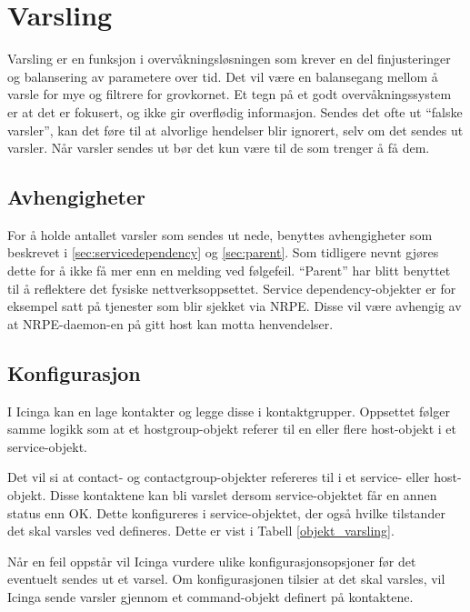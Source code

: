 \section{Varsling}\label{sec:varsling}
Varsling er en funksjon i overvåkningsløsningen som krever en del finjusteringer og balansering av parametere over tid. Det vil være en balansegang mellom å varsle for mye og filtrere for grovkornet. Et tegn på et godt overvåkningssystem er at det er fokusert, og ikke gir overflødig informasjon\cite{buildingnagiosmonitoring}. Sendes det ofte ut ``falske varsler'', kan det føre til at alvorlige hendelser blir ignorert, selv om det sendes ut varsler. Når varsler sendes ut bør det kun være til de som trenger å få dem.

\subsection{Avhengigheter}
For å holde antallet varsler som sendes ut nede, benyttes avhengigheter som beskrevet i \ref{sec:servicedependency}  og \ref{sec:parent}. Som tidligere nevnt gjøres dette for å ikke få mer enn en melding ved følgefeil. ``Parent'' har blitt benyttet til å reflektere det fysiske nettverksoppsettet. Service dependency-objekter er for eksempel satt på tjenester som blir sjekket via NRPE. Disse vil være avhengig av at NRPE-daemon-en på gitt host kan motta henvendelser.

\subsection{Konfigurasjon}
I Icinga kan en lage kontakter og legge disse i kontaktgrupper. Oppsettet følger samme logikk som at et hostgroup-objekt referer til en eller flere host-objekt i et service-objekt.

Det vil si at contact- og contactgroup-objekter refereres til i et service- eller host-objekt. Disse kontaktene kan bli varslet dersom service-objektet får en annen status enn OK. Dette konfigureres i service-objektet, der også hvilke tilstander det skal varsles ved defineres. Dette er vist i Tabell \ref{objekt_varsling}.

Når en feil oppstår vil Icinga vurdere ulike konfigurasjonsopsjoner før det eventuelt sendes ut et varsel. Om konfigurasjonen tilsier at det skal varsles, vil Icinga sende varsler gjennom et command-objekt definert på kontaktene. 

